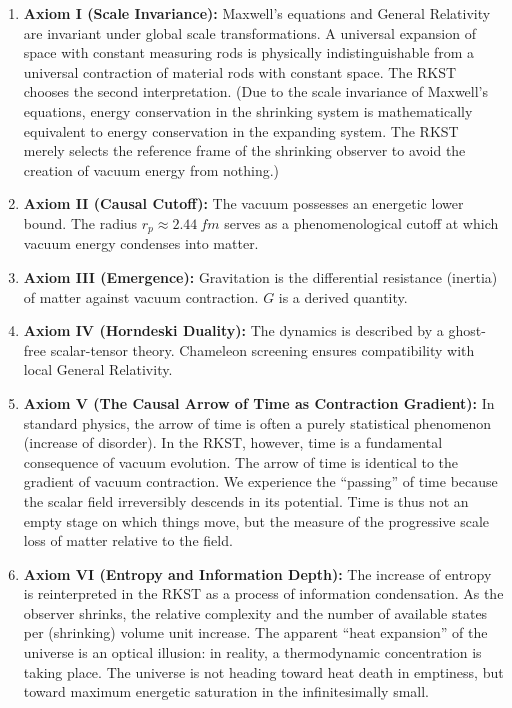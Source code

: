 \documentclass[11pt,a4paper]{article}
\begin{document}
\begin{enumerate}
    \item \textbf{Axiom I (Scale Invariance):} Maxwell’s equations and General Relativity are invariant under global scale transformations. A universal expansion of space with constant measuring rods is physically indistinguishable from a universal contraction of material rods with constant space. The RKST chooses the second interpretation. (Due to the scale invariance of Maxwell’s equations, energy conservation in the shrinking system is mathematically equivalent to energy conservation in the expanding system. The RKST merely selects the reference frame of the shrinking observer to avoid the creation of vacuum energy from nothing.)
    
    \item \textbf{Axiom II (Causal Cutoff):} The vacuum possesses an energetic lower bound. The radius $r_p \approx \SI{2.44}{fm}$ serves as a phenomenological cutoff at which vacuum energy condenses into matter.
    
    \item \textbf{Axiom III (Emergence):} Gravitation is the differential resistance (inertia) of matter against vacuum contraction. $G$ is a derived quantity.
    
    \item \textbf{Axiom IV (Horndeski Duality):} The dynamics is described by a ghost-free scalar-tensor theory. Chameleon screening ensures compatibility with local General Relativity.
    
    \item \textbf{Axiom V (The Causal Arrow of Time as Contraction Gradient):} In standard physics, the arrow of time is often a purely statistical phenomenon (increase of disorder). In the RKST, however, time is a fundamental consequence of vacuum evolution. The arrow of time is identical to the gradient of vacuum contraction. We experience the “passing” of time because the scalar field irreversibly descends in its potential. Time is thus not an empty stage on which things move, but the measure of the progressive scale loss of matter relative to the field.
    
    \item \textbf{Axiom VI (Entropy and Information Depth):} The increase of entropy is reinterpreted in the RKST as a process of information condensation. As the observer shrinks, the relative complexity and the number of available states per (shrinking) volume unit increase. The apparent “heat expansion” of the universe is an optical illusion: in reality, a thermodynamic concentration is taking place. The universe is not heading toward heat death in emptiness, but toward maximum energetic saturation in the infinitesimally small.
\end{enumerate}
\end{document}
